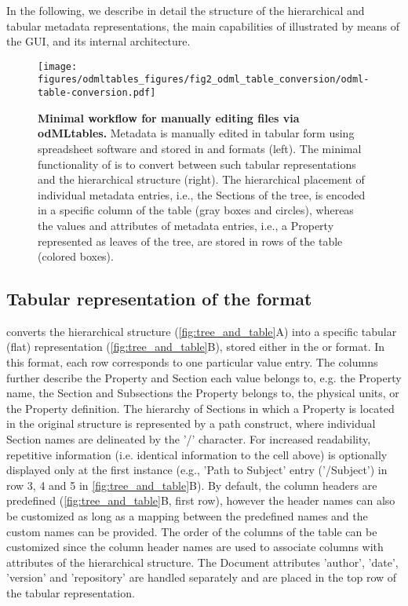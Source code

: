 In the following, we describe in detail the structure of the hierarchical and tabular metadata representations, the main capabilities of  illustrated by means of the GUI, and its internal architecture. 


\begin{figure}[!ht]
\begin{center}
\texttt{[image: figures/odmltables\_figures/fig2\_odml\_table\_conversion/odml-table-conversion.pdf]}
\caption[Minimal workflow for manually editing  files via odMLtables]{{\label{fig:min_workflow}
\textbf{Minimal workflow for manually editing  files via odMLtables.} Metadata is manually edited in tabular form using spreadsheet software and stored in  and  formats (left). The minimal functionality of  is to convert between such tabular representations and the hierarchical  structure (right). The hierarchical placement of individual metadata entries, i.e., the Sections of the  tree, is encoded in a specific column of the table (gray boxes and circles), whereas the values and attributes of metadata entries, i.e., a Property represented as leaves of the  tree, are stored in rows of the table (colored boxes).%
}}
\end{center}
\end{figure}

\subsection{Tabular representation of the  format} 
\label{sec:tabular_format}

 converts the hierarchical  structure (\cref{fig:tree_and_table}A) into a specific tabular (flat) representation (\cref{fig:tree_and_table}B), stored either in the  or  format. In this format, each row corresponds to one particular value entry. The columns further describe the Property and Section each value belongs to, e.g. the Property name, the Section and Subsections the Property belongs to, the physical units, or the Property definition. The hierarchy of Sections in which a Property is located in the original  structure is represented by a path construct, where individual Section names are delineated by the '/' character. For increased readability, repetitive information (i.e. identical information to the cell above) is optionally displayed only at the first instance (e.g., 'Path to Subject' entry ('/Subject') in row 3, 4 and 5 in \cref{fig:tree_and_table}B). By default, the  column headers are predefined (\cref{fig:tree_and_table}B, first row), however the header names can also be customized as long as a mapping between the predefined names and the custom names can be provided. The order of the columns of the table can be customized since the column header names are used to associate columns with attributes of the hierarchical  structure. The  Document attributes 'author', 'date', 'version' and 'repository' are handled separately and are placed in the top row of the tabular  representation.


